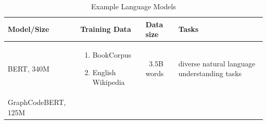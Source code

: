 \begin{table}[htbp]
\centering
\caption{Example Language Models}
\label{LLMs-old}
\begin{tabular}{|p{2.5cm}|p{3.5cm}|p{2.2cm}|p{3.5cm}|}
\hline
\textbf{Model/Size} & \textbf{Training Data} & \textbf{Data size} & \textbf{Tasks} \\ \hline
BERT, 340M & 
\begin{enumerate}
    \item BookCorpus
    \item English Wikipedia
\end{enumerate}  
& ~3.5B words &  diverse natural language understanding
tasks \\ \hline
GraphCodeBERT, 125M & 


\end{tabular}
\end{table}

